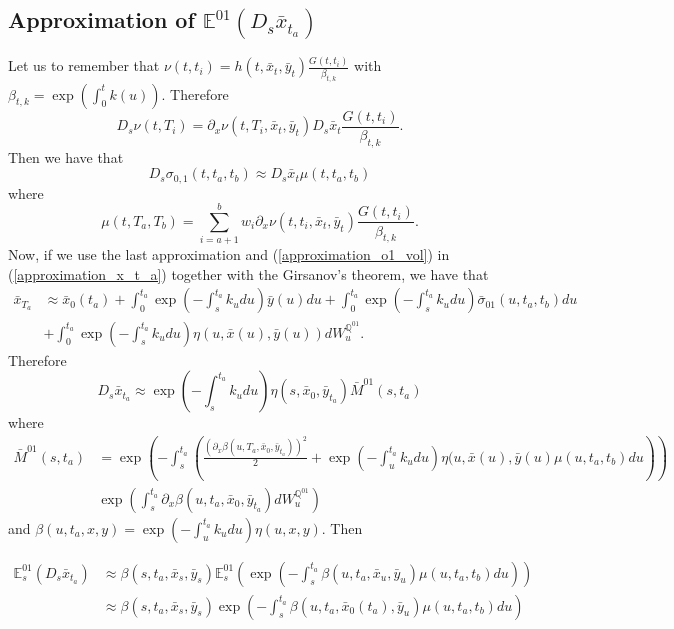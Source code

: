 \documentclass[a4paper,10pt]{article}
\newcommand{\1}{\mathbf{1}}
\begin{document}
\subsection{Approximation of $\mathbb{E}^{01}\left(D_s \bar{x}_{t_a} \right)$}\label{approximation_under_annuity_measeure_d_s}
Let us to remember that $\nu(t,t_i)=h(t,\bar{x}_t,\bar{y}_t) \frac{G(t,t_i)}{\beta_{t,k}}$ with  $\beta_{t,k} = \exp\left(\int_{0}^{t}k(u)\right)$.
Therefore 
\begin{equation*}
D_s \nu(t,T_i) = \partial_x \nu(t,T_i, \bar{x}_t, \bar{y}_t) D_s \bar{x}_t  \frac{G(t,t_i)}{\beta_{t,k}}.
\end{equation*}
Then we have that
\begin{equation}
D_s \sigma_{0,1}(t,t_a,t_b) \approx  D_s \bar{x}_t \mu(t,t_a,t_b)
\end{equation}
where 
$$
\mu(t,T_a,T_b) =  \sum_{i=a+1}^{b} w_i \partial_x \nu(t,t_i, \bar{x}_t, \bar{y}_t) \frac{G(t,t_i)}{\beta_{t,k}}.
$$
Now, if we use the last approximation and (\ref{approximation_o1_vol}) in (\ref{approximation_x_t_a}) together with the Girsanov's theorem, we have that
\begin{align*}
\bar{x}_{T_a} &\approx  \bar{x}_0(t_a)  + \int_{0}^{t_a} \exp\left(-\int_{s}^{t_a}k_u du\right) \bar{y}(u) du + \int_{0}^{t_a} \exp\left(-\int_{s}^{t_a}k_u du\right) \bar{\sigma}_{01}(u,t_a,t_b) du \nonumber \\\
&+  \int_{0}^{t_a}  \exp\left(-\int_{s}^{t_a}k_u du \right) \eta(u,\bar{x}(u),\bar{y}(u)) dW_u^{\mathbb{Q}^{01}}.
\end{align*}
Therefore
\begin{equation*}
D_s \bar{x}_{t_a} \approx  \exp\left(-\int_{s}^{t_a}k_u du \right) \eta(s,\bar{x}_0,\bar{y}_{t_a})\bar{M}^{01}(s,t_a)
\end{equation*}
where
\begin{align*}
\bar{M}^{01}(s,t_a) &= \exp\left(-\int_{s}^{t_a} \left(\frac{\left(\partial_x \beta(u,T_a,\bar{x}_0,\bar{y}_{t_a})\right)^{2}}{2} + \exp\left(-\int_{u}^{t_a}k_u du\right)\eta(u,\bar{x}(u),\bar{y}(u) \mu(u,t_a,t_b) du \right)\right) \\
&\exp\left(\int_{s}^{t_a} \partial_x \beta(u,t_a,\bar{x}_0,\bar{y}_{t_a}) dW^{\mathbb{Q}^{01}}_u \right)
\end{align*}
and $\beta(u,t_a,x,y) = \exp\left(-\int_{u}^{t_a}k_u du\right)\eta(u,x,y)$. Then

\begin{align}\label{approximation_E_01_Ds_x_t}
\mathbb{E}^{01}_s\left(D_s \bar{x}_{t_a}\right) &\approx \beta(s,t_a,\bar{x}_s,\bar{y}_s)  \mathbb{E}_s^{01}\left(\exp\left(-\int_{s}^{t_a}\beta(u,t_a,\bar{x}_u,\bar{y}_u) \mu(u,t_a,t_b) du \right)\right) \nonumber \\
&\approx \beta(s,t_a,\bar{x}_s,\bar{y}_s) \exp\left(-\int_{s}^{t_a}\beta(u,t_a,\bar{x}_{0}(t_a),\bar{y}_u) \mu(u,t_a,t_b) du \right)
\end{align}
\end{document}
